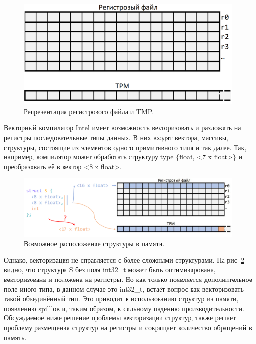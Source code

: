 \begin{figure}[ht]
    \centering
    \includegraphics[scale=0.17]{Images/grf_empty.png}
    \caption{Репрезентация регистрового файла и TMP.}
    \label{fig:mem}
\end{figure}

Векторный компилятор Intel имеет возможность векторизовать и разложить на регистры последовательные типы данных. В них входят вектора, массивы, структуры, состоящие из элементов одного примитивного типа и так далее.
Так, например, компилятор может обработать структуру type \{float, <7 x float>\} и преобразовать её в вектор <8 x float>.

\begin{figure}[ht]
    \centering
    \includegraphics[scale=0.22]{Images/struct.png}
    \caption{Возможное расположение структуры в памяти.}
    \label{fig:lying}
\end{figure}

Однако, векторизация не справляется с более сложными структурами. На рис~\ref{fig:lying} видно, что структура S без поля int32\_t может быть оптимизирована, векторизована и положена на регистры.
Но как только появляется дополнительное поле иного типа, в данном случае это int32\_t, встаёт вопрос как векторизовать такой объединённый тип.
Это приводит к использованию структур из памяти, появлению spill'ов и, таким образом, к сильному падению производительности.
Обсуждаемое ниже решение проблемы векторизации структур, также решает проблему размещения структур на регистры и сокращает количество обращений в память.

